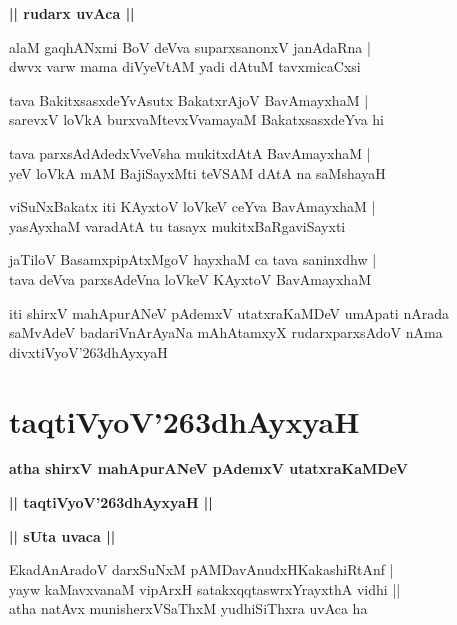 \documentclass[twoside,12pt,openright]{book}
\def\S{\char'263}
\newcounter{shloka}[chapter]
\def\uvaca#1{\centerline{{\large\textbf{#1}}}}
\begin{document}
\uvaca{|| rudarx uvAca ||}

\begin{shloka}%
alaM gaqhANxmi BoV deVva suparxsanonxV janAdaRna |\\
dwvx varw mama diVyeVtAM yadi dAtuM  tavxmicaCxsi 
\end{shloka}

\begin{shloka}%
tava BakitxsasxdeYvAsutx BakatxrAjoV BavAmayxhaM |\\
sarevxV loVkA burxvaMtevxVvamayaM BakatxsasxdeYva hi
\end{shloka}

\begin{shloka}%
tava parxsAdAdedxVveVsha mukitxdAtA BavAmayxhaM |\\
yeV loVkA mAM BajiSayxMti teVSAM dAtA na saMshayaH 
\end{shloka}

\begin{shloka}%
viSuNxBakatx iti KAyxtoV loVkeV ceYva BavAmayxhaM |\\
yasAyxhaM varadAtA tu tasayx mukitxBaRgaviSayxti
\end{shloka}

\begin{shloka}%
jaTiloV BasamxpipAtxMgoV hayxhaM ca tava saninxdhw |\\
tava deVva parxsAdeVna loVkeV KAyxtoV BavAmayxhaM 
\end{shloka}

\begin{center}
iti shirxV mahApurANeV pAdemxV utatxraKaMDeV umApati nArada saMvAdeV badariVnArAyaNa mAhAtamxyX rudarxparxsAdoV nAma 
divxtiVyoV\S dhAyxyaH 
\end{center}

\chapter{taqtiVyoV\S dhAyxyaH}

\begin{center}
{\LARGE\bfseries atha shirxV mahApurANeV pAdemxV utatxraKaMDeV} 
\end{center}

\begin{center}
{\LARGE\bfseries  || taqtiVyoV\S dhAyxyaH ||}
\end{center}

\uvaca{|| sUta uvaca ||}

\begin{shloka}%
EkadAnAradoV darxSuNxM pAMDavAnudxHKakashiRtAnf |\\
yayw kaMavxvanaM vipArxH satakxqqtaswrxYrayxthA vidhi ||\\
atha natAvx munisherxVSaThxM yudhiSiThxra uvAca ha 
\end{shloka}
\end{document}
